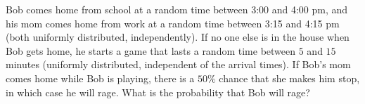 Bob comes home from school at a random time between 3:00 and 4:00 pm, and his mom comes home from work at a random time between 3:15 and 4:15 pm (both uniformly distributed, independently). If no one else is in the house when Bob gets home, he starts a game that lasts a random time between $5$ and $15$ minutes (uniformly distributed, independent of the arrival times). If Bob's mom comes home while Bob is playing, there is a $50\%$ chance that she makes him stop, in which case he will rage. What is the probability that Bob will rage?
